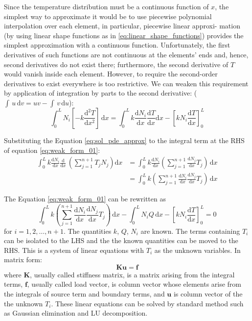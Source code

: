 \documentclass[a4paper,12pt]{article} %
\begin{document}
Since the temperature distribution must be a continuous function of $x$,
the simplest way to approximate it would be to use piecewise polynomial
interpolation over each element, in particular, piecewise linear approxi-
mation (by using linear shape functions as in \ref{eq:linear_shape_functions})
provides the simplest approximation with a continuous function.
Unfortunately, the first derivatives of such functions are not continuous
at the elements' ends and, hence, second derivatives do not exist there;
furthermore, the second derivative of $T$ would vanish inside each element.
However, to require the second-order derivatives to exist everywhere is
too restrictive.
We can weaken this requirement by application of integration by parts to
the second derivative: ($\int\,u\,\mathrm{d}v = uv - \int\,v\,\mathrm{d}u$):
\begin{equation}
\int_{0}^{L} N_{i} \left[ -k\frac{\mathrm{d}^2 T}{\mathrm{d}x^2} \right]\,\mathrm{d}x =
\int_{0}^{L} k \frac{\mathrm{d} N_{i}}{\mathrm{d}x}
\frac{\mathrm{d} T}{\mathrm{d}x} \mathrm{d}x -
\left[ k N_{i} \frac{\mathrm{d}T}{\mathrm{d}x} \right]_{0}^{L}
\label{eq:weak_form_01}
\end{equation}

Substituting the Equation \ref{eq:sol_pde_approx} to the integral
term at the RHS of equation \ref{eq:weak_form_01}:
\begin{align}
\int_{0}^{L} k \frac{\mathrm{d} N_{i}}{\mathrm{d}x}
\frac{\mathrm{d}}{\mathrm{d}x}\, \left( \sum_{j=1}^{n+1} T_{j} N_{j} \right) \mathrm{d}x & =
\int_{0}^{L} k \frac{\mathrm{d} N_{i}}{\mathrm{d}x}
\left( \sum_{j=1}^{n+1} \frac{\mathrm{d}N_{j}}{\mathrm{d}x} T_{j} \right)\, \mathrm{d}x \\
& = \int_{0}^{L} k
\left( \sum_{j=1}^{n+1}
\frac{\mathrm{d} N_{i}}{\mathrm{d}x}
\frac{\mathrm{d}N_{j}}{\mathrm{d}x} T_{j} \right)\, \mathrm{d}x
\end{align}

The Equation \ref{eq:weak_form_01} can be rewritten as
\begin{equation}
\int_{0}^{L} k
\left( \sum_{j=1}^{n+1}
\frac{\mathrm{d} N_{i}}{\mathrm{d}x}
\frac{\mathrm{d}N_{j}}{\mathrm{d}x} T_{j} \right)\, \mathrm{d}x -
\int_{0}^{L} N_{i} Q\, \mathrm{d}x -
\left[ k N_{i} \frac{\mathrm{d}T}{\mathrm{d}x} \right]_{0}^{L} = 0
\label{eq:weak_form_02}
\end{equation}
for $i=1,2,\ldots,n+1$. The quantities $k$, $Q$, $N_{i}$ are known.
The terms containing $T_{i}$ can be isolated to the LHS and the
the known quantities can be moved to the RHS. This is a system
of linear equations with $T_{i}$ as the unknown variables. In matrix form:
\begin{equation}
\mathbf{K} \mathbf{u} = \mathbf{f}
\label{eq:linear_system}
\end{equation}
where $\mathbf{K}$, usually called stiffness matrix,
is a matrix arising from the integral terms,
$\mathbf{f}$, usually called load vector, is
column vector whose elements arise from
the integrals of source term and boundary terms,
and $\mathbf{u}$ is column vector of the the unknown $T_{i}$.
These linear equations
can be solved by standard method such as Gaussian elimination and LU decomposition.
\end{document}
